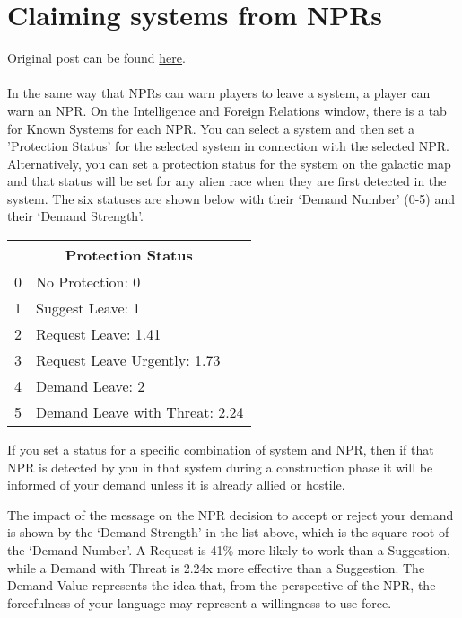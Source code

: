 \documentclass[../../Aurora C# unofficial manual.tex]{subfiles}
\begin{document}
	\section{Claiming systems from NPRs}\label{3_claiming_npr_systems}
	Original post can be found
	\href{http://aurora2.pentarch.org/index.php?topic=8495.msg118362#msg118362}{here}.
	\\\\
	
	In the same way that NPRs can warn players to leave a system, a player can warn an NPR. On the Intelligence and Foreign Relations window, there is a tab for Known Systems for each NPR. You can select a system and then set a 'Protection Status' for the selected system in connection with the selected NPR. Alternatively, you can set a protection status for the system on the galactic map and that status will be set for any alien race when they are first detected in the system. The six statuses are shown below with their ‘Demand Number’ (0-5) and their ‘Demand Strength’.
	
	\begin{center}
		\begin{tabular}{|l|l|}
			\hline
			\multicolumn{2}{|c|}{\textbf{Protection Status}} \\
			\hline
			0 & No Protection: 0 \\
			\hline
			1 & Suggest Leave: 1 \\
			\hline
			2 & Request Leave: 1.41 \\
			\hline
			3 & Request Leave Urgently: 1.73 \\
			\hline
			4 & Demand Leave: 2 \\
			\hline
			5 & Demand Leave with Threat: 2.24 \\
			\hline
		\end{tabular}
	\end{center}
	
	
	If you set a status for a specific combination of system and NPR, then if that NPR is detected by you in that system during a construction phase it will be informed of your demand unless it is already allied or hostile.
	
	The impact of the message on the NPR decision to accept or reject your demand is shown by the ‘Demand Strength’ in the list above, which is the square root of the ‘Demand Number’. A Request is 41\% more likely to work than a Suggestion, while a Demand with Threat is 2.24x more effective than a Suggestion. The Demand Value represents the idea that, from the perspective of the NPR, the forcefulness of your language may represent a willingness to use force.
	
\end{document}

